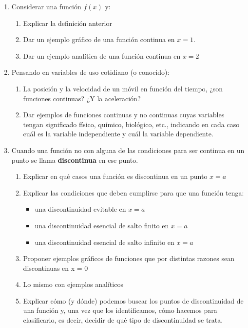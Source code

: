 \documentclass[12pt]{article}
\theoremstyle{definition}
\begin{document}
\begin{enumerate}
\item Considerar una función $f(x)$ y:
\begin{enumerate}
\item Explicar la definición anterior
\item Dar un ejemplo gráfico de una función continua en $x=1$.
\item Dar un ejemplo analítica de una función continua en $x=2$
\end{enumerate}

\item Pensando en variables de uso cotidiano (o conocido):
\begin{enumerate}
\item La posición y la velocidad de un móvil en función del tiempo, ¿son funciones continuas? ¿Y la aceleración? 
\item Dar ejemplos de funciones continuas y no continuas cuyas variables tengan significado físico, químico, biológico, etc., indicando en cada caso cuál es la variable independiente y cuál la variable dependiente.
\end{enumerate}

\item Cuando una función no con alguna de las condiciones para ser continua en un punto se llama \textbf{discontinua} en ese punto.
\begin{enumerate}
\item Explicar en qué casos una función es discontinua en un punto $x = a$
\item Explicar las condiciones que deben cumplirse para que una función tenga:
\begin{itemize}
\item una discontinuidad evitable en $x = a$
\item una discontinuidad esencial de salto finito en $x = a$
\item una discontinuidad esencial de salto infinito en $x = a$
\end{itemize}
\item  Proponer ejemplos gráficos de funciones que por distintas razones sean discontinuas en x = 0
\item  Lo mismo con ejemplos analíticos 
\item  Explicar cómo (y dónde) podemos buscar los puntos de discontinuidad de una función y, una vez que los identificamos, cómo hacemos para clasificarlo, es decir, decidir de qué tipo de discontinuidad se trata.
\end{enumerate}


\end{enumerate}
\end{document}
